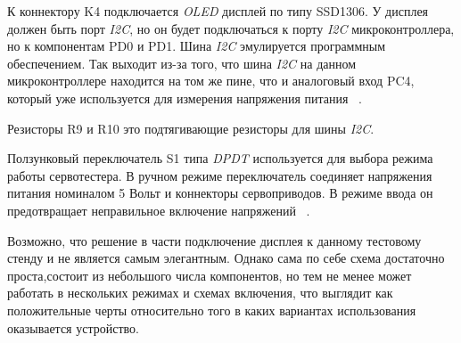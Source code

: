 К коннектору K4 подключается \textit{OLED} дисплей по типу SSD1306.  У
дисплея должен быть порт \textit{I2C}, но он будет подключаться к
порту \textit{I2C} микроконтроллера, но к компонентам PD0 и PD1. Шина
\textit{I2C} эмулируется программным обеспечением. Так выходит из-за
того, что шина \textit{I2C} на данном микроконтроллере находится на
том же пине, что и аналоговый вход PC4, который уже используется для
измерения напряжения питания ~\cite{Elector521}.

Резисторы R9 и R10 это подтягивающие резисторы для шины \textit{I2C}.

Ползунковый переключатель S1 типа \textit{DPDT} используется для
выбора режима работы сервотестера. В ручном режиме переключатель
соединяет напряжения питания номиналом 5 Вольт и коннекторы
сервоприводов. В режиме ввода он предотвращает неправильное включение
напряжений ~\cite{Elector521}.

Возможно, что решение в части подключение дисплея к данному тестовому
стенду и не является самым элегантным. Однако сама по себе схема
достаточно проста,состоит из небольшого числа компонентов, но тем не
менее может работать в нескольких режимах и схемах включения, что
выглядит как положительные черты относительно того в каких вариантах
использования оказывается устройство.

\newpage


